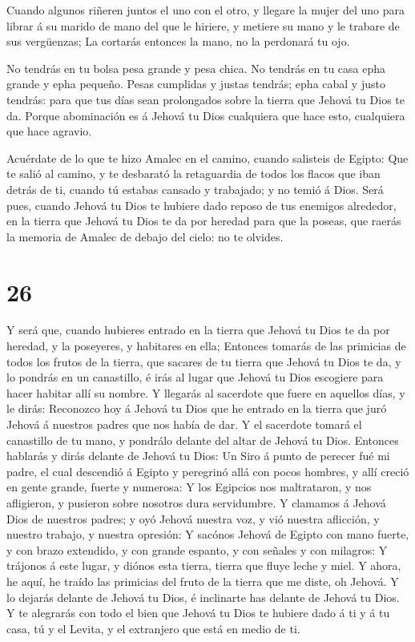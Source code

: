  Cuando algunos riñeren juntos el uno con el otro, y
llegare la mujer del uno para librar á su marido de mano del que le
hiriere, y metiere su mano y le trabare de sus vergüenzas; 
La cortarás entonces la mano, no la perdonará tu ojo.

 No tendrás en tu bolsa pesa grande y pesa chica.
 No tendrás en tu casa epha grande y epha pequeño.
 Pesas cumplidas y justas tendrás; epha cabal y justo
tendrás: para que tus días sean prolongados sobre la tierra que Jehová
tu Dios te da.  Porque abominación es á Jehová tu Dios
cualquiera que hace esto, cualquiera que hace agravio.

 Acuérdate de lo que te hizo Amalec en el camino, cuando
salisteis de Egipto:  Que te salió al camino, y te
desbarató la retaguardia de todos los flacos que iban detrás de ti,
cuando tú estabas cansado y trabajado; y no temió á Dios. 
Será pues, cuando Jehová tu Dios te hubiere dado reposo de tus enemigos
alrededor, en la tierra que Jehová tu Dios te da por heredad para que la
poseas, que raerás la memoria de Amalec de debajo del cielo: no te
olvides.

\hypertarget{section-25}{%
\section{26}\label{section-25}}

 Y será que, cuando hubieres entrado en la tierra que Jehová
tu Dios te da por heredad, y la poseyeres, y habitares en ella;
 Entonces tomarás de las primicias de todos los frutos de la
tierra, que sacares de tu tierra que Jehová tu Dios te da, y lo pondrás
en un canastillo, é irás al lugar que Jehová tu Dios escogiere para
hacer habitar allí su nombre.  Y llegarás al sacerdote que
fuere en aquellos días, y le dirás: Reconozco hoy á Jehová tu Dios que
he entrado en la tierra que juró Jehová á nuestros padres que nos había
de dar.  Y el sacerdote tomará el canastillo de tu mano, y
pondrálo delante del altar de Jehová tu Dios.  Entonces
hablarás y dirás delante de Jehová tu Dios: Un Siro á punto de perecer
fué mi padre, el cual descendió á Egipto y peregrinó allá con pocos
hombres, y allí creció en gente grande, fuerte y numerosa: 
Y los Egipcios nos maltrataron, y nos afligieron, y pusieron sobre
nosotros dura servidumbre.  Y clamamos á Jehová Dios de
nuestros padres; y oyó Jehová nuestra voz, y vió nuestra aflicción, y
nuestro trabajo, y nuestra opresión:  Y sacónos Jehová de
Egipto con mano fuerte, y con brazo extendido, y con grande espanto, y
con señales y con milagros:  Y trájonos á este lugar, y
diónos esta tierra, tierra que fluye leche y miel.  Y
ahora, he aquí, he traído las primicias del fruto de la tierra que me
diste, oh Jehová. Y lo dejarás delante de Jehová tu Dios, é inclinarte
has delante de Jehová tu Dios.  Y te alegrarás con todo el
bien que Jehová tu Dios te hubiere dado á ti y á tu casa, tú y el
Levita, y el extranjero que está en medio de ti.

